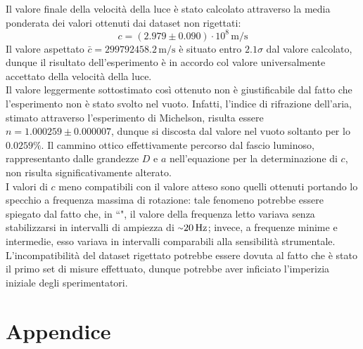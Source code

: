 \documentclass[]{article}
\let\oldsection\section%
\renewcommand{\section}{%
	\renewcommand{\theequation}{\thesection.\arabic{equation}}%
	\oldsection}%
\newcommand{\virgolette}[1]{``\text{#1}"}
\newcommand{\tildetext}{\raise.17ex\hbox{$\scriptstyle\mathtt{\sim}$}}
\begin{document}
    Il valore finale della velocità della luce è stato calcolato attraverso la media ponderata dei valori ottenuti dai dataset non rigettati:
    \begin{equation}
        \label{final-value}
        c = \left( 2.979 \pm 0.090 \right) \cdot 10^8 \, \text{m/s}
    \end{equation}
    Il valore aspettato $\bar{c} = 299792458.2 \,\text{m/s}$ è situato entro $2.1\sigma$ dal valore calcolato, dunque il risultato dell'esperimento è in accordo col valore universalmente accettato della velocità della luce. \\
    Il valore leggermente sottostimato così ottenuto non è giustificabile dal fatto che l'esperimento non è stato svolto nel vuoto. Infatti, l'indice di rifrazione dell'aria, stimato attraverso l'esperimento di Michelson, risulta essere $ n = 1.000259 \pm 0.000007 $, dunque si discosta dal valore nel vuoto soltanto per lo $0.0259 \%$. Il cammino ottico effettivamente percorso dal fascio luminoso, rappresentanto dalle grandezze $D$ e $a$ nell'equazione per la determinazione di $c$, non risulta significativamente alterato.  \\
    I valori di $c$ meno compatibili con il valore atteso sono quelli ottenuti portando lo specchio a frequenza massima di rotazione: tale fenomeno potrebbe essere spiegato dal fatto che, in \virgolette{modalità turbo}, il valore della frequenza letto variava senza stabilizzarsi in intervalli di ampiezza di $\tildetext 20\,\text{Hz}$; invece, a frequenze minime e intermedie, esso variava in intervalli comparabili alla sensibilità strumentale. \\ 
    L'incompatibilità del dataset rigettato potrebbe essere dovuta al fatto che è stato il primo set di misure effettuato, dunque potrebbe aver inficiato l'imperizia iniziale degli sperimentatori.

    \newpage
    \section*{Appendice}
\end{document}
